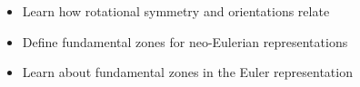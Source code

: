 \begin{learningobjectives}
{\begin{itemize}
    \item[{\color{OCBurntOrange}\ref{\chabbr:sec:rotsym}:}] Learn how rotational symmetry and orientations relate
    \item[{\color{OCBurntOrange}\ref{\chabbr:sec:FZs}:}] Define fundamental zones for neo-Eulerian representations
    \item[{\color{OCBurntOrange}\ref{\chabbr:sec:samplingRFZs}:}] Learn about fundamental zones in the Euler representation 
\end{itemize}}
\end{learningobjectives}


